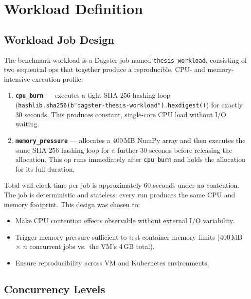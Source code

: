 
\section{Workload Definition}
\label{sec:workloads}

\subsection{Workload Job Design}
\label{subsec:workload-design}

The benchmark workload is a Dagster job named \texttt{thesis\_workload}, consisting of two sequential ops that together produce a reproducible, CPU- and memory-intensive execution profile:

\begin{enumerate}
  \item \textbf{\texttt{cpu\_burn}} --- executes a tight SHA-256 hashing loop (\texttt{hashlib.sha256(b"dagster-thesis-workload").hexdigest()}) for exactly 30 seconds.
    This produces constant, single-core CPU load without I/O waiting.
  \item \textbf{\texttt{memory\_pressure}} --- allocates a 400\,MB NumPy array and then executes the same SHA-256 hashing loop for a further 30 seconds before releasing the allocation.
    This op runs immediately after \texttt{cpu\_burn} and holds the allocation for its full duration.
\end{enumerate}

Total wall-clock time per job is approximately 60 seconds under no contention.
The job is deterministic and stateless: every run produces the same CPU and memory footprint.
This design was chosen to:
\begin{itemize}
  \item Make CPU contention effects observable without external I/O variability.
  \item Trigger memory pressure sufficient to test container memory limits (400\,MB $\times$ $n$ concurrent jobs vs.\ the VM's 4\,GB total).
  \item Ensure reproducibility across VM and Kubernetes environments.
\end{itemize}

\subsection{Concurrency Levels}
\label{subsec:concurrency-levels}

